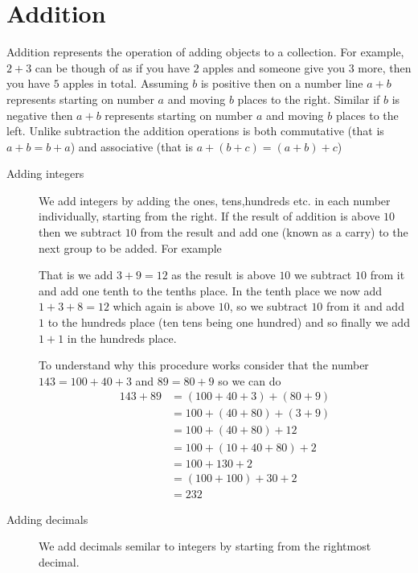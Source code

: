 \newpage
\section{Addition}
Addition represents the operation of adding objects to a collection. For example, $2+3$ can be though of as if you have $2$ apples and someone give you $3$ more, then you have $5$ apples in total. Assuming $b$ is positive then on a number line $a+b$ represents starting on number $a$ and moving $b$ places to the right. Similar if $b$ is negative then $a+b$ represents starting on number $a$ and moving $b$ places to the left. Unlike subtraction the addition operations is both commutative (that is $a + b = b + a$) and associative (that is $a + (b + c) = (a + b) + c$)

\begin{description}
\item [Adding integers] We add integers by adding the ones, tens,hundreds etc. in each number individually, starting from the right. If the result of addition is above $10$ then we subtract $10$ from the result and add one (known as a carry) to the next group to be added. For example
\begin{figure}[H]
\centering
{}
\end{figure}
That is we add $3+9=12$ as the result is above $10$ we subtract $10$ from it and add one tenth to the tenths place. In the tenth place we now add $1+3+8=12$ which again is above $10$, so we subtract $10$ from it and add $1$ to the hundreds place (ten tens being one hundred) and so finally we add $1+1$ in the hundreds place.

To understand why this procedure works consider that the number $143 = 100 + 40 + 3$ and $89 = 80 + 9$ so we can do
\[
\begin{align}
143 + 89 &= (100 + 40 + 3) + (80 + 9) \\
         &= 100 + (40+80) + (3+9)     \\
         &= 100 + (40+80) + 12        \\
         &= 100 + (10+40+80) + 2      \\
         &= 100 + 130 + 2             \\
         &= (100 + 100) + 30 + 2      \\
         &= 232
\end{align}
\]
\item [Adding decimals] We add decimals semilar to integers by starting
from the rightmost decimal.
\begin{figure}[H]
\centering
{}
\end{figure}
\end{description}

